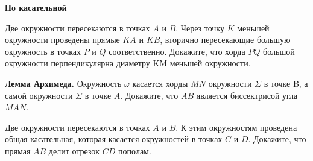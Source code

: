 \newpage

\hspace{3mm}

\centerline{\bf \Huge По касательной}

\begin{flushright}
        \scriptsize{}
\end{flushright}


Две окружности пересекаются в точках $A$ и $B$. Через точку $K$ меньшей окружности проведены прямые $KA$ и $KB$, вторично пересекающие большую окружность в точках $P$ и $Q$ соответственно. Докажите, что хорда $PQ$ большой окружности перпендикулярна диаметру KM меньшей окружности.

\textbf{Лемма Архимеда.} Окружность $\omega$ касается хорды $MN$ окружности $\Sigma$ в точке B, а самой окружности $\Sigma$ в точке $A$. Докажите, что $AB$ является биссектрисой угла $MAN.$

Две окружности пересекаются в точках $A$ и $B$. К этим окружностям проведена общая касательная, которая касается окружностей в точках $C$ и $D$. Докажите, что прямая $AB$ делит отрезок $CD$ пополам.
